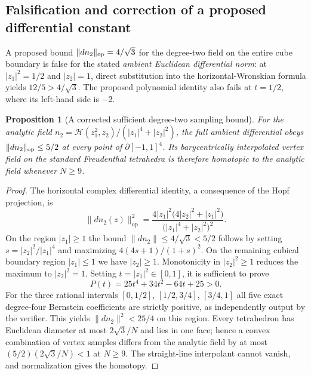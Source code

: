 \documentclass[aps,prd,onecolumn,notitlepage,11pt,superscriptaddress,longbibliography]{revtex4-2}
\newtheorem{proposition}{Proposition}
\begin{document}
\subsection{Falsification and correction of a proposed differential constant}
A proposed bound $\|dn_2\|_{\rm op}=4/\sqrt3$ for the degree-two field on the entire cube boundary is false for the stated \emph{ambient Euclidean differential norm}: at $|z_1|^2=1/2$ and $|z_2|=1$, direct substitution into the horizontal-Wronskian formula yields $12/5>4/\sqrt3$. The proposed polynomial identity also fails at $t=1/2$, where its left-hand side is $-2$.

\begin{proposition}[A corrected sufficient degree-two sampling bound]\label{prop:v10-lipschitz}
For the analytic field $n_2=\mathcal H(z_1^2,z_2)/(|z_1|^4+|z_2|^2)$, the full ambient differential obeys $\|dn_2\|_{\rm op}\le5/2$ at every point of $\partial[-1,1]^4$. Its barycentrically interpolated vertex field on the standard Freudenthal tetrahedra is therefore homotopic to the analytic field whenever $N\ge9$.
\end{proposition}
\begin{proof}
The horizontal complex differential identity, a consequence of the Hopf projection, is
\begin{equation}\label{eq:v10-wronskian}
\|dn_2(z)\|_{\mathrm{op}}^2=
\frac{4|z_1|^{2}\bigl(4|z_2|^2+|z_1|^2\bigr)}{\bigl(|z_1|^4+|z_2|^2\bigr)^2}.
\end{equation}
On the region $|z_1|\ge1$ the bound $\|dn_2\|\le4/\sqrt3<5/2$ follows by setting $s=|z_2|^2/|z_1|^4$ and maximizing $4(4s+1)/(1+s)^2$. On the remaining cubical boundary region $|z_1|\le1$ we have $|z_2|\ge1$. Monotonicity in $|z_2|^2\ge1$ reduces the maximum to $|z_2|^2=1$. Setting $t=|z_1|^2\in[0,1]$, it is sufficient to prove
\begin{equation}
P(t)=25t^4+34t^2-64t+25>0.
\end{equation}
For the three rational intervals $[0,1/2]$, $[1/2,3/4]$, $[3/4,1]$ all five exact degree-four Bernstein coefficients are strictly positive, as independently output by the verifier. This yields $\|dn_2\|^2<25/4$ on this region. Every tetrahedron has Euclidean diameter at most $2\sqrt3/N$ and lies in one face; hence a convex combination of vertex samples differs from the analytic field by at most $(5/2)(2\sqrt3/N)<1$ at $N\ge9$. The straight-line interpolant cannot vanish, and normalization gives the homotopy.\end{proof}
\end{document}
